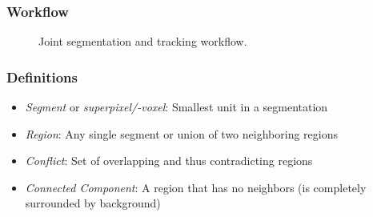 \begin{frame}
    \frametitle{Workflow}
    \begin{figure}
        \centering
        \scalebox{0.65}{
            
        }
        \caption{Joint segmentation and tracking workflow.}
        \label{fig:joint-pipeline}
    \end{figure}
\end{frame}

\begin{frame}
    \frametitle{Definitions}
    \begin{itemize}
          \item \emph{Segment} or \emph{superpixel/-voxel}: Smallest unit in a segmentation
          \item \emph{Region}: Any single segment or union of two neighboring regions
          \item \emph{Conflict}: Set of overlapping and thus contradicting regions
          \item \emph{Connected Component}: A region that has no neighbors (is completely surrounded
        by background)
    \end{itemize}
\end{frame}

